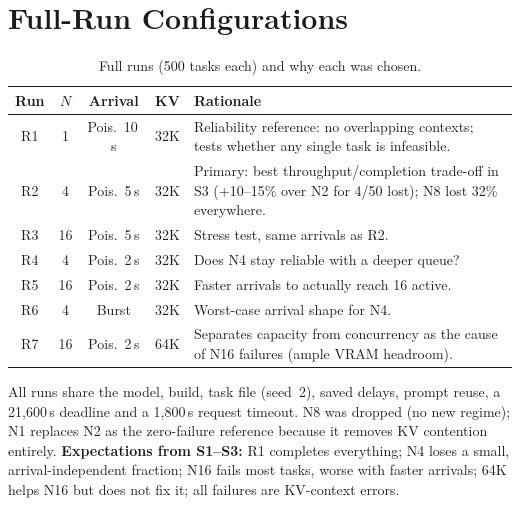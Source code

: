 \documentclass[10pt,twocolumn,letterpaper]{article}
\begin{document}
\section{Full-Run Configurations}
\begin{table}[h]
\centering\small
\caption{Full runs (500 tasks each) and why each was chosen.}
\label{tab:design}
\setlength{\tabcolsep}{2.5pt}
\begin{tabular}{@{}c c c c >{\raggedright\arraybackslash}p{4.15cm}@{}}
\toprule
Run & $N$ & Arrival & KV & Rationale\\
\midrule
R1 & 1 & Pois.\ 10\,s & 32K & Reliability reference: no overlapping contexts; tests whether any single task is infeasible.\\
R2 & 4 & Pois.\ 5\,s & 32K & Primary: best throughput/completion trade-off in S3 (+10--15\% over N2 for 4/50 lost); N8 lost 32\% everywhere.\\
R3 & 16 & Pois.\ 5\,s & 32K & Stress test, same arrivals as R2.\\
R4 & 4 & Pois.\ 2\,s & 32K & Does N4 stay reliable with a deeper queue?\\
R5 & 16 & Pois.\ 2\,s & 32K & Faster arrivals to actually reach 16 active.\\
R6 & 4 & Burst & 32K & Worst-case arrival shape for N4.\\
R7 & 16 & Pois.\ 2\,s & 64K & Separates capacity from concurrency as the cause of N16 failures (ample VRAM headroom).\\
\bottomrule
\end{tabular}
\end{table}
All runs share the model, build, task file (seed~2), saved delays, prompt reuse, a 21{,}600\,s deadline and a 1{,}800\,s request timeout. N8 was dropped (no new regime); N1 replaces N2 as the zero-failure reference because it removes KV contention entirely. \textbf{Expectations from S1--S3:} R1 completes everything; N4 loses a small, arrival-independent fraction; N16 fails most tasks, worse with faster arrivals; 64K helps N16 but does not fix it; all failures are KV-context errors.
\end{document}
